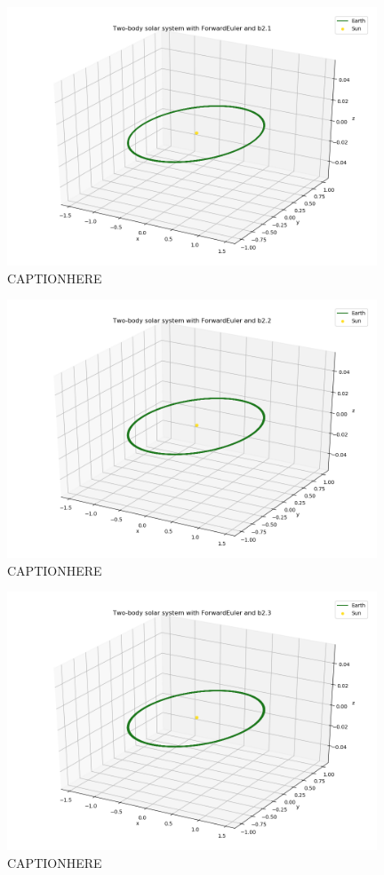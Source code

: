 \documentclass{article}
\begin{document}
    \begin{figure}[H]
        \centering
        \includegraphics[width = 11cm]{img/plot3D_S_E_F_b21.png}
        \caption{CAPTIONHERE}
        \label{fig:plot3D_S_E_F_b21}
    \end{figure}

    \begin{figure}[H]
        \centering
        \includegraphics[width = 11cm]{img/plot3D_S_E_F_b22.png}
        \caption{CAPTIONHERE}
        \label{fig:plot3D_S_E_F_b22}
    \end{figure}

    \begin{figure}[H]
        \centering
        \includegraphics[width = 11cm]{img/plot3D_S_E_F_b23.png}
        \caption{CAPTIONHERE}
        \label{fig:plot3D_S_E_F_b23}
    \end{figure}
\end{document}
